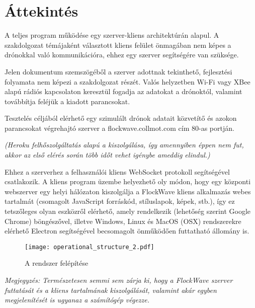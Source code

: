 \section{Áttekintés}

A teljes program működése egy szerver-kliens architektúrán alapul. A
szakdolgozat témájaként választott kliens felület önmagában nem képes a
drónokkal való kommunikációra, ehhez egy szerver segítségére van szüksége.

Jelen dokumentum szemszögéből a szerver adottnak tekinthető, fejlesztési
folyamata nem képezi a szakdolgozat részét. Valós helyzetben Wi-Fi vagy XBee
alapú rádiós kapcsolaton keresztül fogadja az adatokat a drónoktól, valamint
továbbítja feléjük a kiadott parancsokat.

Tesztelés céljából elérhető egy szimulált drónok adatait közvetítő és azokon
parancsokat végrehajtó szerver a flockwave.collmot.com cím 80-as portján.

\textit{
  (Heroku felhőszolgáltatás alapú a kiszolgálása, így amennyiben éppen nem fut,
  akkor az első elérés során több időt vehet igénybe ameddig elindul.)
}

Ehhez a szerverhez a felhasználói kliens WebSocket protokoll segítségével
csatlakozik. A kliens program üzembe helyezhető oly módon, hogy egy központi
webszerver egy helyi hálózaton kiszolgálja a FlockWave kliens alkalmazás webes
tartalmát (csomagolt JavaScript forráskód, stíluslapok, képek, stb.), így ez
tetszőleges olyan eszközről elérhető, amely rendelkezik (lehetőség szerint
Google Chrome) böngészővel, illetve Windows, Linux és MacOS (OSX) rendszerekre
elérhető Electron segítségével becsomagolt önműködően futtatható állomány is.

\begin{figure}[H]
  \centering
    \texttt{[image: operational\_structure\_2.pdf]}
  \caption{A rendszer felépítése}
\end{figure}

\textit{
  Megjegyzés: Természetesen semmi sem zárja ki, hogy a FlockWave szerver
  futtatását és a kliens tartalmának kiszolgálását, valamint akár egyben
  megjelenítését is ugyanaz a számítógép végezze.
}
